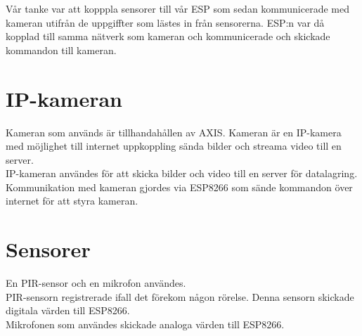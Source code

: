 Vår tanke var att kopppla sensorer till vår ESP som sedan kommunicerade med kameran utifrån de uppgiffter som lästes in från sensorerna. ESP:n var då kopplad till samma nätverk som kameran och kommunicerade och skickade kommandon till kameran.\\

\section{IP-kameran}
Kameran som används är tillhandahållen av AXIS. Kameran är en IP-kamera med möjlighet till internet uppkoppling sända bilder och streama video till en server.\\

IP-kameran användes för att skicka bilder och video till en server för datalagring.\\

Kommunikation med kameran gjordes via ESP8266 som sände kommandon över internet för att styra kameran.\\

\section{Sensorer}
En PIR-sensor och en mikrofon användes.\\

PIR-sensorn registrerade ifall det förekom någon rörelse. Denna sensorn skickade digitala värden till ESP8266.\\

Mikrofonen som användes skickade analoga värden till ESP8266.\\






 






